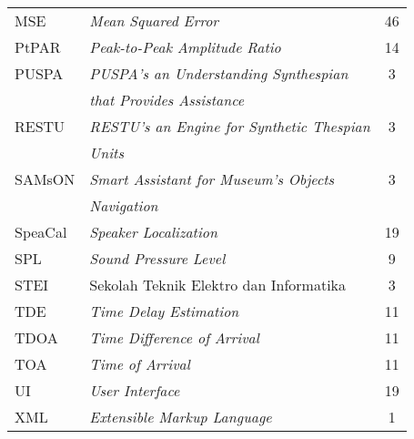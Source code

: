 \begin{center}
\begin{longtable}{p{2.25cm} p{7.75cm} c }
MSE & \textit{Mean Squared Error} & 46 \\[.5em]
PtPAR & \textit{Peak-to-Peak Amplitude Ratio} & 14 \\[.5em]
PUSPA & \textit{PUSPA’s an Understanding Synthespian} & 3 \\
 & \textit{that Provides Assistance} & \\[.5em]
RESTU & \textit{RESTU’s an Engine for Synthetic Thespian} & 3 \\
 & \textit{Units} & \\[.5em]
SAMsON & \textit{Smart Assistant for Museum’s Objects} & 3 \\
 & \textit{Navigation} & \\[.5em]
SpeaCal & \textit{Speaker Localization} & 19 \\[.5em]
SPL & \textit{Sound Pressure Level} & 9 \\[.5em]
STEI & Sekolah Teknik Elektro dan Informatika & 3 \\[.5em]
TDE & \textit{Time Delay Estimation} & 11 \\[.5em]
TDOA & \textit{Time Difference of Arrival} & 11 \\[.5em]
TOA & \textit{Time of Arrival} & 11 \\[.5em]
UI & \textit{User Interface} & 19 \\[.5em]
XML & \textit{Extensible Markup Language} & 1 \\[.5em]
\end{longtable}
\end{center}
